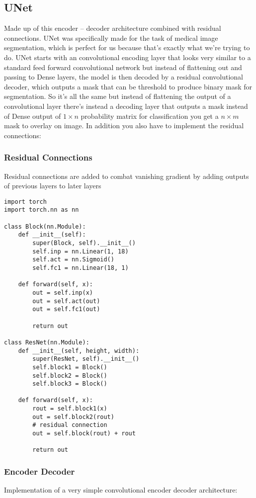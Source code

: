 \documentclass[11pt]{article}
\begin{document}
\subsection{UNet}
\label{sec:org7bd9cd8}
Made up of this encoder -- decoder architecture combined with residual connections. UNet was specifically made for the task of medical image segmentation, which is perfect for us because that's exactly what we're trying to do. UNet starts with an convolutional encoding layer that looks very similar to a standard feed forward convolutional network but instead of flattening out and passing to Dense layers, the model is then decoded by a residual convolutional decoder, which outputs a mask that can be threshold to produce binary mask for segmentation.
So it's all the same but instead of flattening the output of a convolutional layer there's instead a decoding layer that outputs a mask instead of Dense output of \(1\times n\) probability matrix for classification you get a \(n\times m\) mask to overlay on image. In addition you also have to implement the residual connections:

\subsubsection{Residual Connections}
\label{sec:orga6a0d57}
Residual connections are added to combat vanishing gradient by adding outputs of previous layers to later layers
\begin{verbatim}
import torch
import torch.nn as nn

class Block(nn.Module):
    def __init__(self):
        super(Block, self).__init__()
        self.inp = nn.Linear(1, 18)
        self.act = nn.Sigmoid()
        self.fc1 = nn.Linear(18, 1)

    def forward(self, x):
        out = self.inp(x)
        out = self.act(out)
        out = self.fc1(out)

        return out

class ResNet(nn.Module):
    def __init__(self, height, width):
        super(ResNet, self).__init__()
        self.block1 = Block()
        self.block2 = Block()
        self.block3 = Block()

    def forward(self, x):
        rout = self.block1(x)
        out = self.block2(rout)
        # residual connection
        out = self.block(rout) + rout

        return out
\end{verbatim}

\subsubsection{Encoder Decoder}
\label{sec:orgeb0ad26}
Implementation of a very simple convolutional encoder decoder architecture:
\end{document}
